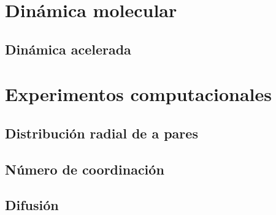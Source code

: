 \section{Dinámica molecular}

\subsection{Dinámica acelerada}

\section{Experimentos computacionales}

\subsection{Distribución radial de a pares}

\subsection{Número de coordinación}

\subsection{Difusión}
